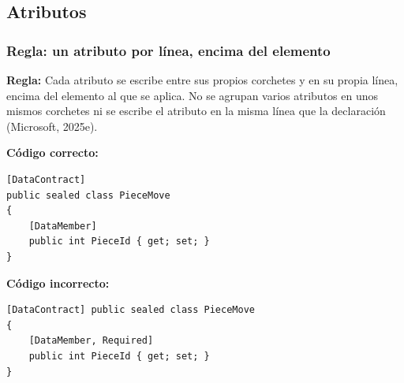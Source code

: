 \subsection{Atributos}

\subsubsection{Regla: un atributo por línea, encima del elemento}

\textbf{Regla:} Cada atributo se escribe entre sus propios corchetes y en su propia línea, encima del elemento al que se aplica. No se agrupan varios atributos en unos mismos corchetes ni se escribe el atributo en la misma línea que la declaración (Microsoft, 2025e).

\textbf{Código correcto:}
\begin{lstlisting}[style=csharpstyle]
[DataContract]
public sealed class PieceMove
{
    [DataMember]
    public int PieceId { get; set; }
}
\end{lstlisting}

\textbf{Código incorrecto:}
\begin{lstlisting}[style=csharpstyle]
[DataContract] public sealed class PieceMove
{
    [DataMember, Required]
    public int PieceId { get; set; }
}
\end{lstlisting}
